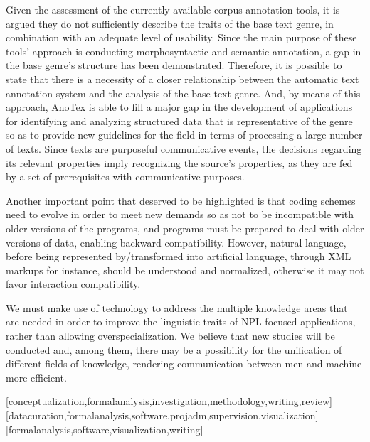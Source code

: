 \documentclass[english]{textolivre}
\begin{document}
Given the assessment of the currently available corpus annotation tools, it is argued they do not sufficiently describe the traits of the base text genre, in combination with an adequate level of usability. Since the main purpose of these tools’ approach is conducting morphosyntactic and semantic annotation, a gap in the base genre’s structure has been demonstrated. Therefore, it is possible to state that there is a necessity of a closer relationship between the automatic text annotation system and the analysis of the base text genre. And, by means of this approach, AnoTex is able to fill a major gap in the development of applications for identifying and analyzing structured data that is representative of the genre so as to provide new guidelines for the field in terms of processing a large number of texts. Since texts are purposeful communicative events, the decisions regarding its relevant properties imply recognizing the source’s properties, as they are fed by a set of prerequisites with communicative purposes.
 
Another important point that deserved to be highlighted is that coding schemes need to evolve in order to meet new demands so as not to be incompatible with older versions of the programs, and programs must be prepared to deal with older versions of data, enabling backward compatibility. However, natural language, before being represented by/transformed into artificial language, through XML markups for instance, should be understood and normalized, otherwise it may not favor interaction compatibility.

We must make use of technology to address the multiple knowledge areas that are needed in order to improve the linguistic traits of NPL-focused applications, rather than allowing overspecialization. We believe that new studies will be conducted and, among them, there may be a possibility for the unification of different fields of knowledge, rendering communication between men and machine more efficient.

\printbibliography\label{sec-bib}


\begin{contributors}
[conceptualization,formalanalysis,investigation,methodology,writing,review]
[datacuration,formalanalysis,software,projadm,supervision,visualization]
[formalanalysis,software,visualization,writing]
\end{contributors}
\end{document}
